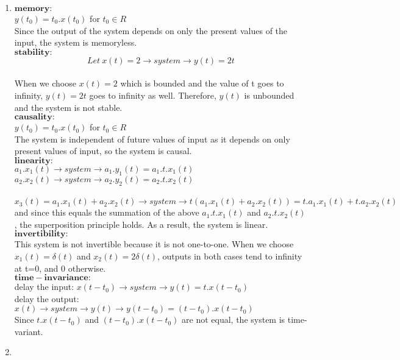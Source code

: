 \documentclass[10pt,a4paper, margin=1in]{article}
\begin{document}
\begin{enumerate}
\begin{enumerate}
 	    
   \item %
    $\boldsymbol{memory:}$ \\
    $y(t_0) = t_0.x(t_0)$ for $t_0 \in R$ \\
    Since the output of the system depends on only the present values of the input, the system is memoryless. \\
    $\boldsymbol{stability:}$ \\
    $$Let \ x(t) = 2 \rightarrow system \rightarrow y(t) = 2t$$ \\
    When we choose $x(t)=2$ which is bounded and the value of t goes to infinity, $y(t) = 2t$ goes to infinity as well. Therefore, $y(t)$ is unbounded and the system is not stable. \\ 
    $\boldsymbol{causality:}$ \\
    $y(t_0) = t_0.x(t_0)$ for $t_0 \in R$ \\
    The system is independent of future values of input as it depends on only present values of input, so the system is causal. \\
    $\boldsymbol{linearity:}$ \\
    $a_1.x_1(t) \rightarrow system \rightarrow a_1.y_1(t) = a_1.t.x_1(t)$ \\
    $a_2.x_2(t) \rightarrow system \rightarrow a_2.y_2(t) = a_2.t.x_2(t)$ \\ \\
    $x_3(t) = a_1.x_1(t) + a_2.x_2(t) \rightarrow system \rightarrow t(a_1.x_1(t) + a_2.x_2(t)) = t.a_1.x_1(t) + t.a_2.x_2(t)$ and since this equals the summation of the above $a_1.t.x_1(t)$ and $a_2.t.x_2(t)$, the superposition principle holds. As a result, the system is linear. \\
    $\boldsymbol{invertibility:}$ \\
    This system is not invertible because it is not one-to-one. When we choose $x_1(t) = \delta(t)$ and $x_2(t) = 2\delta(t)$, outputs in both cases tend to infinity at t=0, and 0 otherwise. \\
    $\boldsymbol{time-invariance:}$ \\
    delay the input:  $x(t-t_0) \rightarrow system \rightarrow y(t) = t.x(t-t_0)$ \\
    delay the output: $x(t) \rightarrow system \rightarrow y(t) \rightarrow y(t-t_0) = (t-t_0).x(t-t_0)$ \\
    Since $t.x(t-t_0)$ and $(t-t_0).x(t-t_0)$ are not equal, the system is time-variant.
    
    \item %
    

\end{enumerate}
\end{enumerate}
\end{document}
